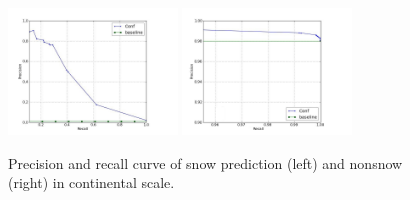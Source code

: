 \begin{figure}
\begin{center}
\includegraphics[width=0.40\textwidth,clip,trim=0.4in 0 0.8in 0]{figure/PR-snow.jpg}
\includegraphics[width=0.40\textwidth,clip,trim=0.4in 0 0.8in 0]{figure/PR-nonsnow.jpg}
\end{center}
\vspace{-12pt}
\caption{Precision and recall curve of snow prediction (left) and nonsnow (right) in continental scale.}
\label{fig:snowcurve}
\vspace{-12pt}
\end{figure}